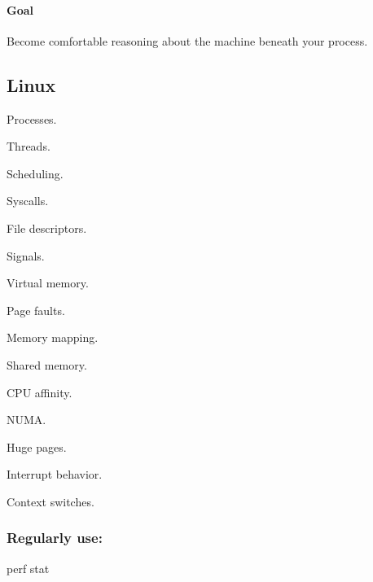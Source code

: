 \documentclass[11pt,letterpaper]{article}
\begin{document}
\label{stage:4}

\paragraph*{Goal}

Become comfortable reasoning about the machine beneath your process.

\subsection*{Linux}

\begin{topics}

\item Processes.

\item Threads.

\item Scheduling.

\item Syscalls.

\item File descriptors.

\item Signals.

\item Virtual memory.

\item Page faults.

\item Memory mapping.

\item Shared memory.

\item CPU affinity.

\item NUMA.

\item Huge pages.

\item Interrupt behavior.

\item Context switches.

\end{topics}

\subsubsection*{Regularly use:}

{\ttfamily\raggedright perf stat\par}
\end{document}

